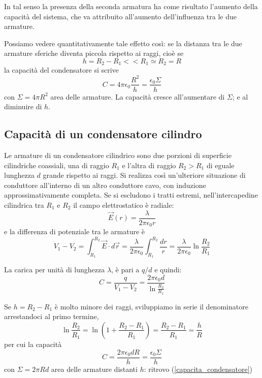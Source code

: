 \documentclass[class=book, crop=false, oneside, 12pt]{standalone}
\begin{document}
In tal senso la presenza della seconda armatura ha come risultato l'aumento della capacità del sistema, che va attribuito all'aumento dell'influenza tra le due armature.

Possiamo vedere quantitativamente tale effetto così: se la distanza tra le due armature sferiche diventa piccola rispetto ai raggi, cioè se 
\begin{equation*}
    h = R_2 - R_1 << R_1 \simeq R_2 = R
\end{equation*}
la capacità del condensatore si scrive
\begin{equation} \label{capacita_condensatore}
    C = 4 \pi \epsilon_0 \frac{R^2}{h} = \frac{\epsilon_0 \Sigma}{h}
\end{equation}
con \(\Sigma = 4 \pi R^2\) area delle armature. 
La capacità cresce all'aumentare di \(\Sigma\); e al diminuire di \(h\).

\subsection{Capacità di un condensatore cilindro}

Le armature di un condensatore cilindrico sono due porzioni di superficie cilindriche coassiali, una di raggio \(R_1\) e l'altra di raggio \(R_2 > R_1\) di eguale lunghezza \(d\) grande rispetto ai raggi. 
Si realizza così un'ulteriore situazione di conduttore all'interno di un altro conduttore cavo, con induzione approssimativamente completa. 
Se si escludono i tratti estremi, nell'intercapedine cilindrica tra \(R_1\) e \(R_2\) il campo elettrostatico è radiale:
\begin{equation*}
    \overrightarrow{E}(r) = \frac{\lambda}{2 \pi \epsilon_0 r}
\end{equation*} 
e la differenza di potenziale tra le armature è
\begin{equation*}
    V_1 - V_2 = \int_{R_1}^{R_2} \overrightarrow{E} \cdot d \overrightarrow{r} = \frac{\lambda}{2 \pi \epsilon_0} \int_{R_1}^{R_2} \frac{d r}{r} = \frac{\lambda}{2 \pi \epsilon_0} \ln \frac{R_2}{R_1}
\end{equation*}

La carica per unità di lunghezza \(\lambda\), è pari a \(q/d\) e quindi:
\begin{equation} \label{capacita_condensatre_cilindrico}
    C = \frac{q}{V_1 - V_2} = \frac{2 \pi \epsilon_0 d}{\ln \frac{R_2}{R_1}}
\end{equation}

Se \(h = R_2 -R_1\) è molto minore dei raggi, sviluppiamo in serie il denominatore arrestandoci al primo termine,
\begin{equation*}
    \ln \frac{R_2}{R_1} = \ln \left(1 + \frac{R_2 - R_1}{R_1}\right) = \frac{R_2 - R_1}{R_1} = \frac{h}{R}
\end{equation*}
per cui la capacità
\begin{equation}
    C= \frac{2 \pi \epsilon_0 d R}{h} = \frac{\epsilon_0 \Sigma}{h}
\end{equation}
con \(\Sigma = 2 \pi R d\) area delle armature distanti \(h\): ritrovo (\ref{capacita_condensatore})
\end{document}
